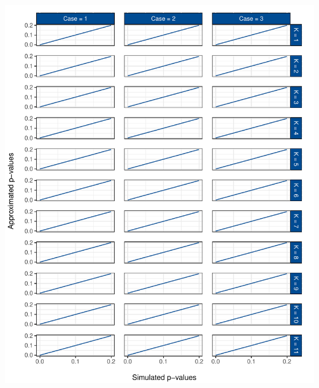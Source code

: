 \documentclass[12pt,a4paper]{article}
\let\origfigure\figure
\let\endorigfigure\endfigure
\renewenvironment{figure}[1][2] {
    \expandafter\origfigure\expandafter[H]
} {
    \endorigfigure
}
\begin{document}
\begin{figure}
\centering
\includegraphics{p_approx_paper_files/figure-latex/approx_sim-all_0.2-1.pdf}
\caption{\label{fig:sim_approx_all_0.2} Simulated vs.~approximated
\(p\)-values for the lower tail of the distribution for the first case
and all underlying test included.}
\end{figure}
\end{document}
